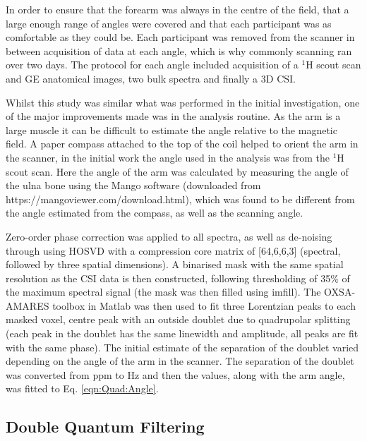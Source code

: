 In order to ensure that the forearm was always in the centre of the field, that a large enough range of angles were covered and that each participant was as comfortable as they could be. Each participant was removed from the scanner in between acquisition of data at each angle, which is why commonly scanning ran over two days. The protocol for each angle included  acquisition of a $^1$H scout scan and \ac{GE} anatomical images, two bulk spectra and finally a 3D \ac{CSI}. 

Whilst this study was similar what was performed in the initial investigation, one of the major improvements made was in the analysis routine. As the arm is a large muscle it can be difficult to estimate the angle relative to the magnetic field. A paper compass attached to the top of the coil helped to orient the arm in the scanner, in the initial work the angle used in the analysis was from the $^1$H scout scan. Here the angle of the arm was calculated by measuring the angle of the ulna bone using the Mango software (downloaded from https://mangoviewer.com/download.html), which was found to be different from the angle estimated from the compass, as well as the scanning angle.

Zero-order phase correction was applied to all spectra, as well as de-noising through using \ac{HOSVD}\cite{Bader2007EfficientTensors} with a compression core matrix of [64,6,6,3] (spectral, followed by three spatial dimensions). A binarised mask with the same spatial resolution as the \ac{CSI} data is then constructed, following thresholding of 35\% of the maximum spectral signal (the mask was then filled using imfill). The OXSA-AMARES \cite{Purvis2017OXSA:MATLAB} toolbox in Matlab was then used to fit three Lorentzian peaks to each masked voxel, centre peak with an outside doublet due to quadrupolar splitting (each peak in the doublet has the same linewidth and amplitude, all peaks are fit with the same phase). The initial estimate of the separation of the doublet varied depending on the angle of the arm in the scanner. The separation of the doublet was converted from ppm to Hz and then the values, along with the arm angle, was fitted to Eq. \ref{eqn:Quad:Angle}.

\subsection{Double Quantum Filtering}

